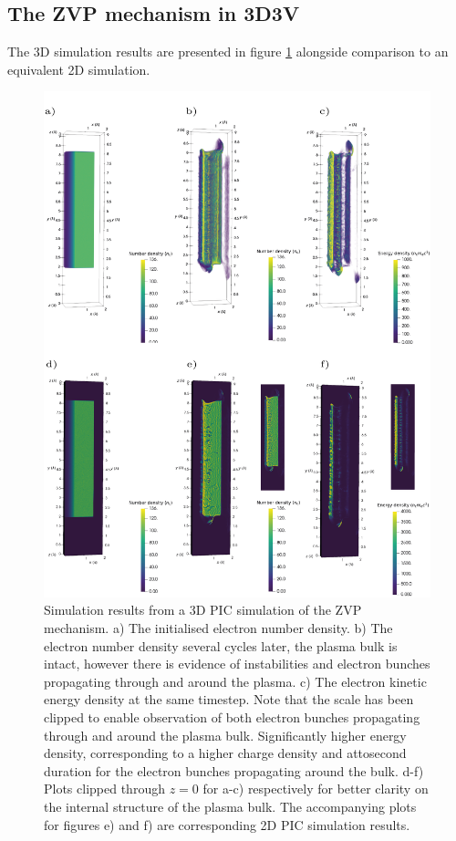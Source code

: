 \subsection{The ZVP mechanism in 3D3V}
The 3D simulation results are presented in figure \ref{fig:zvp3d} alongside comparison to an equivalent 2D simulation.
\begin{figure}
	\centering
	\includegraphics[width=1\linewidth]{figures/zvp/zvp_3D}
	\caption[Simulation results from a 3D \ac{PIC} simulation of the \ac{ZVP} mechanism. ]{Simulation results from a 3D \ac{PIC} simulation of the \ac{ZVP} mechanism. a) The initialised electron number density. b) The electron number density several cycles later, the plasma bulk is intact, however there is evidence of instabilities and electron bunches propagating through and around the plasma. c) The electron kinetic energy density at the same timestep. Note that the scale has been clipped to enable observation of both electron bunches propagating through and around the plasma bulk. Significantly higher energy density, corresponding to a higher charge density and attosecond duration for the electron bunches propagating around the bulk. d-f) Plots clipped through $z=0$ for a-c) respectively for better clarity on the internal structure of the plasma bulk. The accompanying plots for figures e) and f) are corresponding 2D PIC simulation results.}
	\label{fig:zvp3d}
\end{figure}
